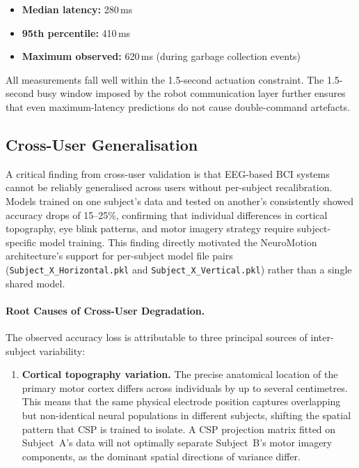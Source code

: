 \documentclass[12pt, a4paper, oneside]{report}
\begin{document}
\begin{description}
\begin{itemize}
  \item \textbf{Median latency:} 280\,ms
  \item \textbf{95th percentile:} 410\,ms
  \item \textbf{Maximum observed:} 620\,ms (during garbage collection events)
\end{itemize}

All measurements fall well within the 1.5-second actuation constraint. The
1.5-second busy window imposed by the robot communication layer further ensures
that even maximum-latency predictions do not cause double-command artefacts.

\subsection{Cross-User Generalisation}
\label{sec:cross_user}

A critical finding from cross-user validation is that EEG-based BCI systems cannot
be reliably generalised across users without per-subject recalibration. Models
trained on one subject's data and tested on another's consistently showed accuracy
drops of 15--25\%, confirming that individual differences in cortical topography,
eye blink patterns, and motor imagery strategy require subject-specific model
training. This finding directly motivated the NeuroMotion architecture's support
for per-subject model file pairs (\texttt{Subject\_X\_Horizontal.pkl} and
\texttt{Subject\_X\_Vertical.pkl}) rather than a single shared model.

\paragraph{Root Causes of Cross-User Degradation.}
The observed accuracy loss is attributable to three principal sources of
inter-subject variability:

\begin{enumerate}
    \item \textbf{Cortical topography variation.}
    The precise anatomical location of the primary motor cortex differs across
    individuals by up to several centimetres. This means that the same physical
    electrode position captures overlapping but non-identical neural populations
    in different subjects, shifting the spatial pattern that CSP is trained to
    isolate. A CSP projection matrix fitted on Subject~A's data will not
    optimally separate Subject~B's motor imagery components, as the dominant
    spatial directions of variance differ.


\end{enumerate}
\end{description}
\end{document}
